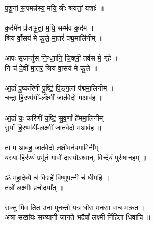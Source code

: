 प॒शू॒नां रू॒पमन्न॑स्य॒ मयि॒ श्रीः श्र॑यतां॒-यशाः॑ ॥\\
\\
क॒र्दमे॑न प्र॑जाभू॒ता॒ म॒यि॒ सम्भ॑व क॒र्दम ।\\
श्रियं॑-वाँ॒सय॑ मे कु॒ले॒ मा॒तरं॑ पद्म॒मालि॑नीम् ॥\\
\\
आपः॑ सृ॒जन्तु॑स् नि॒ग्धाा॒नि॒ चि॒क्ली॒ तव॑स मे॒ गृहे ।\\
नि च॑ दे॒वीं मा॒तरं॒ श्रियं॑-वा॒सय॑ मे कु॒ले ॥\\
\\
आ॒र्द्रां पु॒ष्करि॑णीं पु॒ष्टिं॒ पि॒ङ्ग॒लां प॑द्ममा॒लिनीम् ।\\
च॒न्द्रां हि॒रण्म॑यीं-लँ॒क्ष्मीं जात॑वेदो म॒आव॑ह ॥\\
\\
आ॒र्द्रां-यः॒ करि॑णीं-य॒ष्टिं॒ सु॒व॒र्णां हे॑ममा॒लिनीम् ।\\
सू॒र्यां हि॒रण्म॑यीं-ल॒क्ष्मीं॒ जात॑वेदो म॒आव॑ह ॥\\
\\
तां म॒ आव॑ह॒ जात॑वेदो ल॒क्षीमन॑पगा॒मिनी᳚म् ।\\
यस्यां॒ हिर॑ण्यं॒ प्रभू॑तं॒ गावो॑ दा॒स्योऽश्वा॑न्, वि॒न्देयं॒ पुरु॑षान॒हम् ॥\\
\\
ॐ म॒हा॒दे॒व्यै च॑ वि॒द्महे॑ विष्णुप॒त्नी च॑ धीमहि ।\\
तन्नो॑ लक्ष्मीः प्रचो॒दया᳚त् ॥\\
\\
सक्तु मिव तित उना पुनन्तो यत्र धीरा मनसा वाच मक्रत । \\
अत्रा सखा᳚यः सख्यानी जानते भद्रैषां᳚ लक्ष्मी र्निहिता धिवाचि ॥\\
